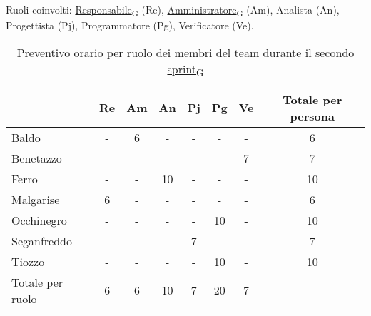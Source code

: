 Ruoli coinvolti: \href{https://7last.github.io/docs/rtb/documentazione-interna/glossario\#responsabile}{Responsabile\textsubscript{G}} (Re), \href{https://7last.github.io/docs/rtb/documentazione-interna/glossario\#amministratore}{Amministratore\textsubscript{G}} (Am), Analista (An), Progettista (Pj), Programmatore (Pg), Verificatore (Ve).
\begin{table}[!h]
	\centering
	\begin{tabular}{ | l | c | c | c | c | c | c | c | }
		\hline
		\textbf{}        & \textbf{Re} & \textbf{Am} & \textbf{An} & \textbf{Pj} & \textbf{Pg} & \textbf{Ve} & \textbf{Totale per persona} \\
		\hline
		Baldo            & -           & 6           & -           & -           & -           & -           & 6                           \\
		Benetazzo        & -           & -           & -           & -           & -           & 7           & 7                           \\
		Ferro            & -           & -           & 10          & -           & -           & -           & 10                          \\
		Malgarise        & 6           & -           & -           & -           & -           & -           & 6                           \\
		Occhinegro       & -           & -           & -           & -           & 10          & -           & 10                          \\
		Seganfreddo      & -           & -           & -           & 7           & -           & -           & 7                           \\
		Tiozzo           & -           & -           & -           & -           & 10          & -           & 10                          \\
		\hline
		Totale per ruolo & 6           & 6           & 10          & 7           & 20          & 7           & -                           \\
		\hline
	\end{tabular}
	\caption{Preventivo orario per ruolo dei membri del team durante il secondo \href{https://7last.github.io/docs/rtb/documentazione-interna/glossario\#sprint}{sprint\textsubscript{G}}}
	
\end{table}

